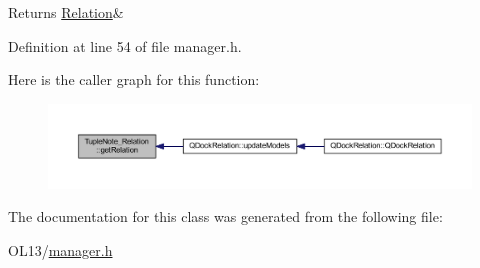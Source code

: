 \begin{DoxyReturn}{Returns}
\hyperlink{class_relation}{Relation}\& 
\end{DoxyReturn}


Definition at line 54 of file manager.\+h.

Here is the caller graph for this function\+:
\nopagebreak
\begin{figure}[H]
\begin{center}
\leavevmode
\includegraphics[width=350pt]{class_tuple_note___relation_ad326a5fee3d7bec52bda9e0234377d8e_icgraph}
\end{center}
\end{figure}


The documentation for this class was generated from the following file\+:\begin{DoxyCompactItemize}
\item 
O\+L13/\hyperlink{manager_8h}{manager.\+h}\end{DoxyCompactItemize}
